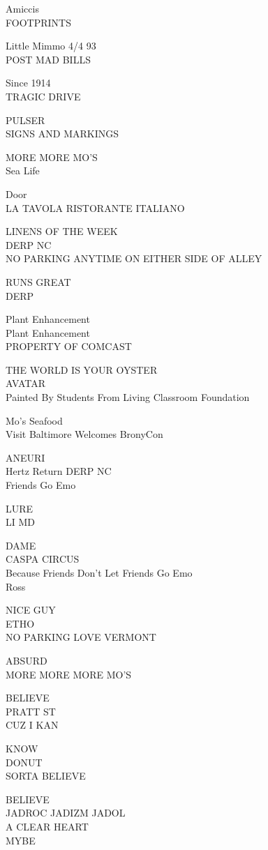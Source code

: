 \documentclass[10pt,letterpaper]{article}
\begin{document}
Amiccis\\
FOOTPRINTS

Little Mimmo 4/4 93\\
POST MAD BILLS

Since 1914\\
TRAGIC DRIVE

PULSER\\
SIGNS AND MARKINGS

MORE MORE MO'S\\
Sea Life

Door\\
LA TAVOLA RISTORANTE ITALIANO

LINENS OF THE WEEK\\
DERP NC\\
NO PARKING ANYTIME ON EITHER SIDE OF ALLEY

RUNS GREAT\\
DERP

Plant Enhancement\\
Plant Enhancement\\
PROPERTY OF COMCAST

THE WORLD IS YOUR OYSTER\\
AVATAR\\
Painted By Students From Living Classroom Foundation

Mo's Seafood\\
Visit Baltimore Welcomes BronyCon

ANEURI\\
Hertz Return DERP NC\\
Friends Go Emo

LURE\\
LI MD

DAME\\
CASPA CIRCUS\\
Because Friends Don't Let Friends Go Emo\\
Ross

NICE GUY\\
ETHO\\
NO PARKING LOVE VERMONT

ABSURD\\
MORE MORE MORE MO'S

BELIEVE\\
PRATT ST\\
CUZ I KAN

KNOW\\
DONUT\\
SORTA BELIEVE

BELIEVE\\
JADROC JADIZM JADOL\\
A CLEAR HEART\\
MYBE
\end{document}
